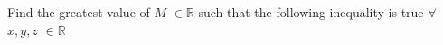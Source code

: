 Find the greatest value of $M$ $\in \mathbb{R}$ such that the following inequality is true $\forall$ $x, y, z$ $\in \mathbb{R}$
